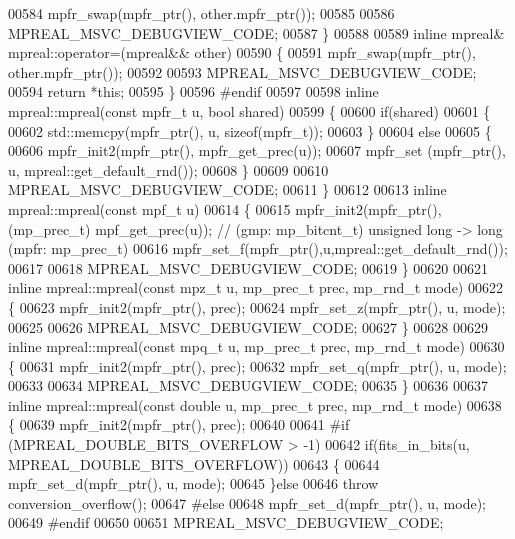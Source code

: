 \begin{DoxyCode}
00584     mpfr\_swap(mpfr\_ptr(), other.mpfr\_ptr());
00585 
00586     MPREAL\_MSVC\_DEBUGVIEW\_CODE;
00587 \}
00588 
00589 \textcolor{keyword}{inline} mpreal& mpreal::operator=(mpreal&& other)
00590 \{
00591     mpfr\_swap(mpfr\_ptr(), other.mpfr\_ptr());
00592 
00593     MPREAL\_MSVC\_DEBUGVIEW\_CODE;
00594     \textcolor{keywordflow}{return} *\textcolor{keyword}{this};
00595 \}
00596 \textcolor{preprocessor}{#endif}
00597 
00598 \textcolor{keyword}{inline} mpreal::mpreal(\textcolor{keyword}{const} mpfr\_t  u, \textcolor{keywordtype}{bool} shared)
00599 \{
00600     \textcolor{keywordflow}{if}(shared)
00601     \{
00602         std::memcpy(mpfr\_ptr(), u, \textcolor{keyword}{sizeof}(mpfr\_t));
00603     \}
00604     \textcolor{keywordflow}{else}
00605     \{
00606         mpfr\_init2(mpfr\_ptr(), mpfr\_get\_prec(u));
00607         mpfr\_set  (mpfr\_ptr(), u, mpreal::get\_default\_rnd());
00608     \}
00609 
00610     MPREAL\_MSVC\_DEBUGVIEW\_CODE;
00611 \}
00612 
00613 \textcolor{keyword}{inline} mpreal::mpreal(\textcolor{keyword}{const} mpf\_t u)
00614 \{
00615     mpfr\_init2(mpfr\_ptr(),(mp\_prec\_t) mpf\_get\_prec(u)); \textcolor{comment}{// (gmp: mp\_bitcnt\_t) unsigned long -> long (mpfr:
       mp\_prec\_t)}
00616     mpfr\_set\_f(mpfr\_ptr(),u,mpreal::get\_default\_rnd());
00617 
00618     MPREAL\_MSVC\_DEBUGVIEW\_CODE;
00619 \}
00620 
00621 \textcolor{keyword}{inline} mpreal::mpreal(\textcolor{keyword}{const} mpz\_t u, mp\_prec\_t prec, mp\_rnd\_t mode)
00622 \{
00623     mpfr\_init2(mpfr\_ptr(), prec);
00624     mpfr\_set\_z(mpfr\_ptr(), u, mode);
00625 
00626     MPREAL\_MSVC\_DEBUGVIEW\_CODE;
00627 \}
00628 
00629 \textcolor{keyword}{inline} mpreal::mpreal(\textcolor{keyword}{const} mpq\_t u, mp\_prec\_t prec, mp\_rnd\_t mode)
00630 \{
00631     mpfr\_init2(mpfr\_ptr(), prec);
00632     mpfr\_set\_q(mpfr\_ptr(), u, mode);
00633 
00634     MPREAL\_MSVC\_DEBUGVIEW\_CODE;
00635 \}
00636 
00637 \textcolor{keyword}{inline} mpreal::mpreal(\textcolor{keyword}{const} \textcolor{keywordtype}{double} u, mp\_prec\_t prec, mp\_rnd\_t mode)
00638 \{
00639      mpfr\_init2(mpfr\_ptr(), prec);
00640 
00641 \textcolor{preprocessor}{#if (MPREAL\_DOUBLE\_BITS\_OVERFLOW > -1)}
00642   \textcolor{keywordflow}{if}(fits\_in\_bits(u, MPREAL\_DOUBLE\_BITS\_OVERFLOW))
00643   \{
00644     mpfr\_set\_d(mpfr\_ptr(), u, mode);
00645   \}\textcolor{keywordflow}{else}
00646     \textcolor{keywordflow}{throw} conversion\_overflow();
00647 \textcolor{preprocessor}{#else}
00648   mpfr\_set\_d(mpfr\_ptr(), u, mode);
00649 \textcolor{preprocessor}{#endif}
00650 
00651     MPREAL\_MSVC\_DEBUGVIEW\_CODE;

\end{DoxyCode}
